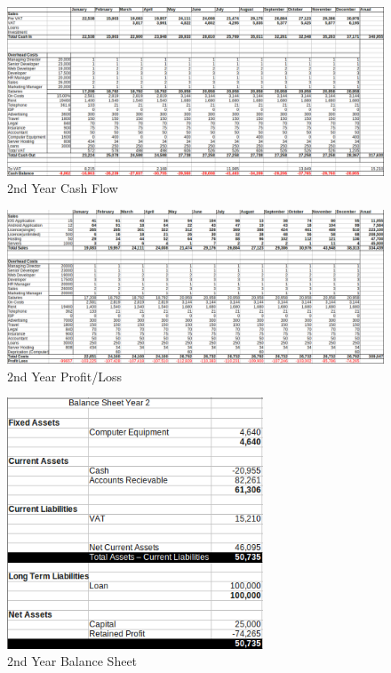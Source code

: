 \documentclass{article}
\begin{document}
\begin{landscape}

\begin{figure}[h]
\centering
        \includegraphics[width=9.0in]{cash_flow_year2.png}
        \caption{2nd Year Cash Flow}
        \label{2nd Year Cash Flow}
\end{figure}

\begin{figure}[h]
\centering
        \includegraphics[width=9.0in]{profit_loss_year2.png}
        \caption{2nd Year Profit/Loss}
        \label{2nd Year Profit/Loss}
\end{figure}

\end{landscape}
\begin{figure}[h]
\centering
        \includegraphics[width=3.0in]{balance_sheet_year2.png}
        \caption{2nd Year Balance Sheet}
        \label{2nd Year Balance Sheet}
\end{figure}
\end{document}
